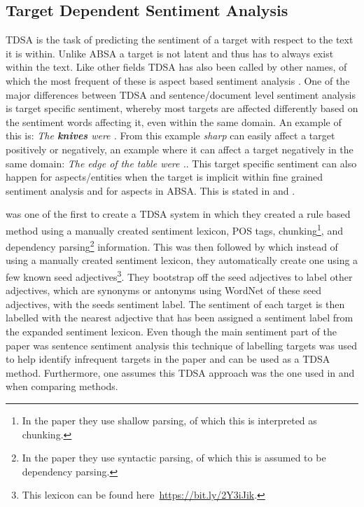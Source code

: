 \subsection{Target Dependent Sentiment Analysis}

TDSA is the task of predicting the sentiment of a target with respect to the text it is within. Unlike ABSA a target is not latent and thus has to always exist within the text. Like other fields TDSA has also been called by other names, of which the most frequent of these is aspect based sentiment analysis \citep{wang-etal-2016-attention}. One of the major differences between TDSA and sentence/document level sentiment analysis is target specific sentiment, whereby most targets are affected differently based on the sentiment words affecting it, even within the same domain. An example of this is: \textit{The \textbf{knives} were .} From this example \textit{sharp} can easily affect a target positively or negatively, an example where it can affect a target negatively in the same domain: \textit{The edge of the table were .}. This target specific sentiment can also happen for aspects/entities when the target is implicit within fine grained sentiment analysis and for aspects in ABSA. This is stated in \citet[\S2]{ding2008holistic} and \citet[\S3.3.4]{popescu-etzioni-2005-extracting}.

\citet{nasukawa2003sentiment} was one of the first to create a TDSA system in which they created a rule based method using a manually created sentiment lexicon, POS tags, chunking\footnote{In the paper they use shallow parsing, of which this is interpreted as chunking.}, and dependency parsing\footnote{In the paper they use syntactic parsing, of which this is assumed to be dependency parsing.} information. This was then followed by \citep{hu2004mining} which instead of using a manually created sentiment lexicon, they automatically create one using a few known seed adjectives\footnote{This lexicon can be found here~\url{https://bit.ly/2Y3iJik}.}.  They bootstrap off the seed adjectives to label other adjectives, which are synonyms or antonyms using WordNet \citep{miller1995wordnet} of these seed adjectives, with the seeds sentiment label. The sentiment of each target is then labelled with the nearest adjective that has been assigned a sentiment label from the expanded sentiment lexicon. Even though the main sentiment part of the paper was sentence sentiment analysis this technique of labelling targets was used to help identify infrequent targets in the paper and can be used as a TDSA method. Furthermore, one assumes this TDSA approach was the one used in \citet{popescu-etzioni-2005-extracting} and \citet{ding2008holistic} when comparing methods.

